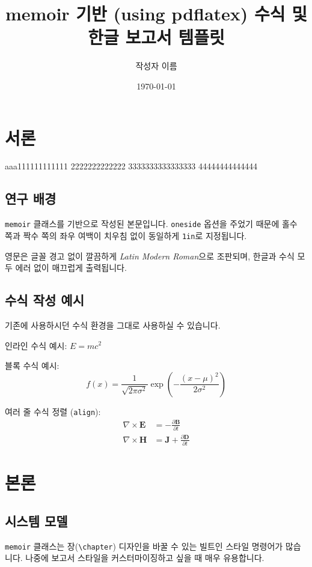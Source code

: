 \documentclass[12pt, a4paper, oneside]{memoir}
\title{memoir 기반 (using pdflatex) 수식 및 한글 보고서 템플릿}
\author{작성자 이름}
\date{\today}
\begin{document}
\maketitle

\tableofcontents
\newpage

\chapter{서론}
aaa111111111111
2222222222222
3333333333333333
44444444444444
\section{연구 배경}
\texttt{memoir} 클래스를 기반으로 작성된 본문입니다. \texttt{oneside} 옵션을 주었기 때문에 홀수 쪽과 짝수 쪽의 좌우 여백이 치우침 없이 동일하게 \texttt{1in}로 지정됩니다. 

영문은 글꼴 경고 없이 깔끔하게 \textit{Latin Modern Roman}으로 조판되며, 한글과 수식 모두 에러 없이 매끄럽게 출력됩니다.

\section{수식 작성 예시}
기존에 사용하시던 수식 환경을 그대로 사용하실 수 있습니다.

인라인 수식 예시: $E = mc^2$

블록 수식 예시:
\begin{equation}
    f(x) = \frac{1}{\sqrt{2\pi\sigma^2}} \exp\left( -\frac{(x-\mu)^2}{2\sigma^2} \right)
\end{equation}

여러 줄 수식 정렬 (\texttt{align}):
\begin{align}
    \nabla \times \mathbf{E} &= -\frac{\partial \mathbf{B}}{\partial t} \\
    \nabla \times \mathbf{H} &= \mathbf{J} + \frac{\partial \mathbf{D}}{\partial t}
\end{align}

\chapter{본론}
\section{시스템 모델}
\texttt{memoir} 클래스는 장(\texttt{\textbackslash chapter}) 디자인을 바꿀 수 있는 빌트인 스타일 명령어가 많습니다. 나중에 보고서 스타일을 커스터마이징하고 싶을 때 매우 유용합니다.
\end{document}

